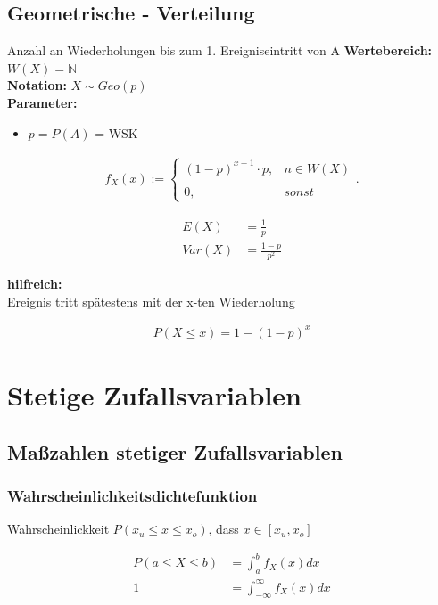 \documentclass[10pt,a4paper]{article}
\begin{document}
  \newpage

\subsection{Geometrische - Verteilung}
Anzahl an Wiederholungen bis zum 1. Ereigniseintritt von A
\textbf{Wertebereich:} $W(X)= \mathbb{N}$ \\
\textbf{Notation:} $X \sim Geo(p)$ \\
\textbf{Parameter:} \begin{itemize}
    \item $ p=P(A)$ = WSK
\end{itemize}

  \begin{mdframed}[style=exercise]
    \begin{align}
        f_X(x):=\left\{\begin{array}{ll} (1-p)^{x-1} \cdot p, & n \in W(X) \\ \\
        0, & sonst \end{array}\right. .
    \end{align}
  \end{mdframed}

  \begin{mdframed}[style=exercise]
    \begin{align}
        E(X) &= \frac{1}{p} \\
        Var(X) &= \frac{1-p}{p^2}
    \end{align}
  \end{mdframed}
\textbf{hilfreich:}\\
Ereignis tritt spätestens mit der x-ten Wiederholung
  \begin{mdframed}[style=exercise]
    \begin{align}
        P(X \leq x) = 1-(1-p)^x
    \end{align}
  \end{mdframed}

  \newpage
  \section{Stetige Zufallsvariablen}

    \subsection{Maßzahlen stetiger Zufallsvariablen}
    \subsubsection{Wahrscheinlichkeitsdichtefunktion}
    Wahrscheinlickkeit $P(x_u \leq x \leq x_o )$, dass $x \in [x_u,x_o]$ 
      \begin{mdframed}[style=exercise]
        \begin{align}
            P(a \leq X \leq b ) &= \displaystyle\int_{a}^{b} f_X(x) dx \\
            1 &= \displaystyle\int_{-\infty}^{\infty} f_X(x)dx 
        \end{align}
      \end{mdframed}
\end{document}
